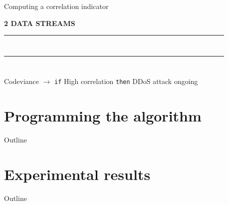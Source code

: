 \documentclass[mathserif]{beamer}
\begin{document}
	\begin{frame}{Computing a correlation indicator}
	
	\begin{center}
		\textbf{2 DATA STREAMS}
	\end{center}
	
	\begin{center}\begin{tabular}{|c|c|c|c|c|c|c|c|c|c|c|c|c|c|c|c|c|c|c|c|}
	\hline
	~ & ~ & \cellcolor{purple}~ & ~ & \cellcolor{purple}~ & ~ & ~ & \cellcolor{purple}~ & ~ & ~ & \cellcolor{purple}~ & ~ & ~ & ~ & ~ & ~ & ~ &\cellcolor{purple}~ & ~ & ~ \\
	\hline
	\end{tabular}\end{center}
	
	\begin{center}\begin{tabular}{|c|c|c|c|c|c|c|c|c|c|c|c|c|c|c|c|c|c|c|c|}
	\hline
	\cellcolor{purple}~ & ~ & ~ & ~ & \cellcolor{purple}~ & ~ & \cellcolor{purple}~ & ~ & ~ & ~ & \cellcolor{purple}~ & ~ & ~ & ~ & \cellcolor{purple}~ & ~ & ~ & ~ & \cellcolor{purple}~ & ~ \\
	\hline
	\end{tabular}\end{center}
	
	\begin{alertblock}{Codeviance $\longrightarrow$ \texttt{if} High correlation \texttt{then} DDoS attack ongoing}
	\end{alertblock}
	
	
	\end{frame}
	

\section{Programming the algorithm}

	\begin{frame}{Outline}
		\tableofcontents[currentsection]
	\end{frame}

	\begin{frame}
	
	\end{frame}
	
	
\section{Experimental results}

	\begin{frame}{Outline}
		\tableofcontents[currentsection]
	\end{frame}
\end{document}
